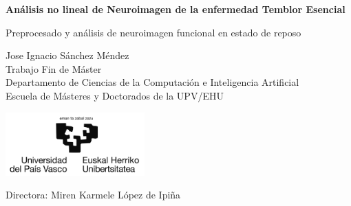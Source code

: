 
\thispagestyle{empty}

\begin{titlepage}
    \begin{center}

		\Huge
		\textbf{Análisis no lineal de Neuroimagen de la enfermedad Temblor Esencial}
		
		\vspace{0.5cm}
		\LARGE
		Preprocesado y análisis de neuroimagen funcional en estado de reposo 
		
		\vspace{1.5cm}
		
		\Large{Jose Ignacio Sánchez Méndez}\\

		Trabajo Fin de Máster\\
		Departamento de Ciencias de la Computación e Inteligencia Artificial\\
		Escuela de Másteres y Doctorados de la UPV/EHU
		
		\includegraphics[width=0.4\textwidth]{img/universidad}
		
		
	\end{center}
	
\vfill

\noindent Directora: Miren Karmele López de Ipiña
\end{titlepage}
